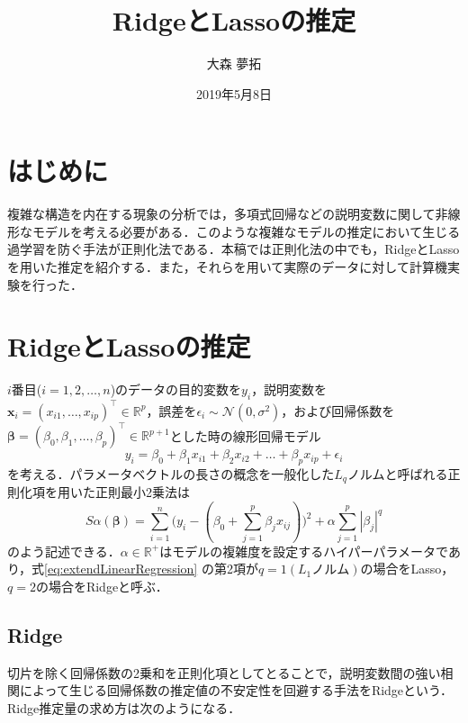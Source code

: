 \documentclass[a4paper,twocolumn]{ujarticle} %
\title{RidgeとLassoの推定} %
\date{2019年5月8日}
\author{大森 夢拓}
\begin{document}
\maketitle
\section{はじめに}
複雑な構造を内在する現象の分析では，多項式回帰などの説明変数に関して非線形なモデルを考える必要がある．このような複雑なモデルの推定において生じる過学習を防ぐ手法が正則化法である．本稿では正則化法の中でも，RidgeとLassoを用いた推定を紹介する．また，それらを用いて実際のデータに対して計算機実験を行った．
\section{RidgeとLassoの推定}
$i$番目($i = 1, 2, \dots, n$)のデータの目的変数を$y_i$，説明変数を$\bm{x}_i=(x_{i1}, \dots, x_{ip})^{\top} \in \mathbb{R}^p$，誤差を$\epsilon_i \sim \mathcal{N}(0, \sigma^2)$，および回帰係数を$\bm{\beta}=(\beta_0, \beta_1, \dots , \beta_p)^{\top} \in \mathbb{R}^{p+1}$とした時の線形回帰モデル
\begin{equation}
	y_i=\beta_0 + \beta_1 x_{i1} + \beta_2  x_{i2} + \dots + \beta_p x_{ip} + \epsilon_i
	\label{eq:linear_model_origin}
\end{equation}
を考える．パラメータベクトルの長さの概念を一般化した$L_q$ノルムと呼ばれる正則化項を用いた正則最小2乗法は
\begin{equation}
	S\alpha(\bm{\beta}) = \sum_{i=1}^{n}\bigl(
		y_i - (
			\beta_0 + \sum_{j=1}^{p} \beta_j {x}_{ij}
		)
	\bigr)^2 + \alpha \sum_{j=1}^{p} |\beta_j|^q
	\label{eq:extendLinearRegression}
\end{equation}
のよう記述できる．$\alpha \in \mathbb{R}^+$はモデルの複雑度を設定するハイパーパラメータであり，式\eqref{eq:extendLinearRegression} の第2項が$q=1 (L_1ノルム)$の場合をLasso，$q=2$の場合をRidgeと呼ぶ．
\subsection{Ridge}
切片を除く回帰係数の2乗和を正則化項としてとることで，説明変数間の強い相関によって生じる回帰係数の推定値の不安定性を回避する手法をRidgeという．Ridge推定量の求め方は次のようになる．
\end{document}
